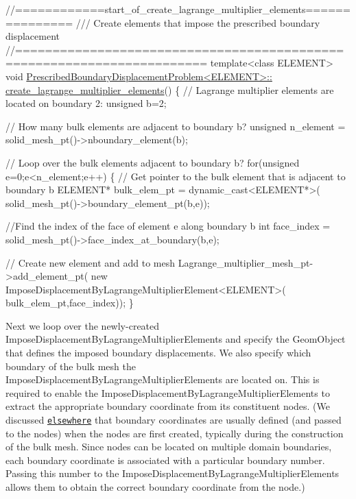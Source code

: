  
\begin{DoxyCodeInclude}
\textcolor{comment}{//============start\_of\_create\_lagrange\_multiplier\_elements===============}
\textcolor{comment}{/// Create elements that impose the prescribed boundary displacement}
\textcolor{comment}{}\textcolor{comment}{//=======================================================================}
\textcolor{keyword}{template}<\textcolor{keyword}{class} ELEMENT>
\textcolor{keywordtype}{void} \hyperlink{classPrescribedBoundaryDisplacementProblem_adf4798f13809f5b2f2be6e3d63421edc}{PrescribedBoundaryDisplacementProblem<ELEMENT>::}
\hyperlink{classPrescribedBoundaryDisplacementProblem_adf4798f13809f5b2f2be6e3d63421edc}{create\_lagrange\_multiplier\_elements}()
\{
 \textcolor{comment}{// Lagrange multiplier elements are located on boundary 2:}
 \textcolor{keywordtype}{unsigned} b=2;

 \textcolor{comment}{// How many bulk elements are adjacent to boundary b?}
 \textcolor{keywordtype}{unsigned} n\_element = solid\_mesh\_pt()->nboundary\_element(b);
 
 \textcolor{comment}{// Loop over the bulk elements adjacent to boundary b?}
 \textcolor{keywordflow}{for}(\textcolor{keywordtype}{unsigned} e=0;e<n\_element;e++)
  \{
   \textcolor{comment}{// Get pointer to the bulk element that is adjacent to boundary b}
   ELEMENT* bulk\_elem\_pt = \textcolor{keyword}{dynamic\_cast<}ELEMENT*\textcolor{keyword}{>}(
    solid\_mesh\_pt()->boundary\_element\_pt(b,e));
   
   \textcolor{comment}{//Find the index of the face of element e along boundary b}
   \textcolor{keywordtype}{int} face\_index = solid\_mesh\_pt()->face\_index\_at\_boundary(b,e);
      
   \textcolor{comment}{// Create new element and add to mesh}
   Lagrange\_multiplier\_mesh\_pt->add\_element\_pt(
    \textcolor{keyword}{new} ImposeDisplacementByLagrangeMultiplierElement<ELEMENT>(
     bulk\_elem\_pt,face\_index));   
  \}  

\end{DoxyCodeInclude}


Next we loop over the newly-\/created {\ttfamily Impose\+Displacement\+By\+Lagrange\+Multiplier\+Elements} and specify the {\ttfamily Geom\+Object} that defines the imposed boundary displacements. We also specify which boundary of the bulk mesh the {\ttfamily Impose\+Displacement\+By\+Lagrange\+Multiplier\+Elements} are located on. This is required to enable the {\ttfamily Impose\+Displacement\+By\+Lagrange\+Multiplier\+Elements} to extract the appropriate boundary coordinate from its constituent nodes. (We discussed \href{../../../poisson/fish_poisson2/html/index.html#boundary_coords}{\tt elsewhere} that boundary coordinates are usually defined (and passed to the nodes) when the nodes are first created, typically during the construction of the bulk mesh. Since nodes can be located on multiple domain boundaries, each boundary coordinate is associated with a particular boundary number. Passing this number to the {\ttfamily Impose\+Displacement\+By\+Lagrange\+Multiplier\+Elements} allows them to obtain the correct boundary coordinate from the node.)


